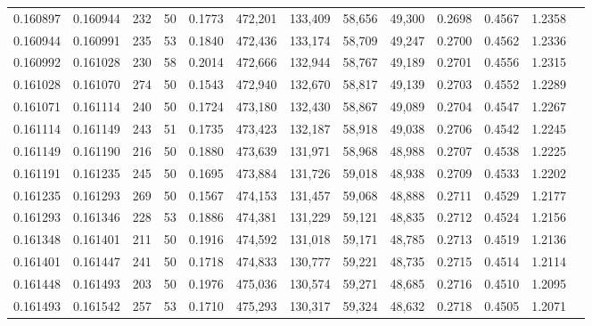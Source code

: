 \begin{tabular}{rrrrrrrrrrrrr}
0.160897 & 0.160944 &   232 &  50 &                                     0.1773 & 472,201 & 133,409 &  58,656 &  49,300 & 0.2698 & 0.4567 & 1.2358 \\
0.160944 & 0.160991 &   235 &  53 &                                     0.1840 & 472,436 & 133,174 &  58,709 &  49,247 & 0.2700 & 0.4562 & 1.2336 \\
0.160992 & 0.161028 &   230 &  58 &                                     0.2014 & 472,666 & 132,944 &  58,767 &  49,189 & 0.2701 & 0.4556 & 1.2315 \\
0.161028 & 0.161070 &   274 &  50 &                                     0.1543 & 472,940 & 132,670 &  58,817 &  49,139 & 0.2703 & 0.4552 & 1.2289 \\
0.161071 & 0.161114 &   240 &  50 &                                     0.1724 & 473,180 & 132,430 &  58,867 &  49,089 & 0.2704 & 0.4547 & 1.2267 \\
0.161114 & 0.161149 &   243 &  51 &                                     0.1735 & 473,423 & 132,187 &  58,918 &  49,038 & 0.2706 & 0.4542 & 1.2245 \\
0.161149 & 0.161190 &   216 &  50 &                                     0.1880 & 473,639 & 131,971 &  58,968 &  48,988 & 0.2707 & 0.4538 & 1.2225 \\
0.161191 & 0.161235 &   245 &  50 &                                     0.1695 & 473,884 & 131,726 &  59,018 &  48,938 & 0.2709 & 0.4533 & 1.2202 \\
0.161235 & 0.161293 &   269 &  50 &                                     0.1567 & 474,153 & 131,457 &  59,068 &  48,888 & 0.2711 & 0.4529 & 1.2177 \\
0.161293 & 0.161346 &   228 &  53 &                                     0.1886 & 474,381 & 131,229 &  59,121 &  48,835 & 0.2712 & 0.4524 & 1.2156 \\
0.161348 & 0.161401 &   211 &  50 &                                     0.1916 & 474,592 & 131,018 &  59,171 &  48,785 & 0.2713 & 0.4519 & 1.2136 \\
0.161401 & 0.161447 &   241 &  50 &                                     0.1718 & 474,833 & 130,777 &  59,221 &  48,735 & 0.2715 & 0.4514 & 1.2114 \\
0.161448 & 0.161493 &   203 &  50 &                                     0.1976 & 475,036 & 130,574 &  59,271 &  48,685 & 0.2716 & 0.4510 & 1.2095 \\
0.161493 & 0.161542 &   257 &  53 &                                     0.1710 & 475,293 & 130,317 &  59,324 &  48,632 & 0.2718 & 0.4505 & 1.2071 \\

\end{tabular}
